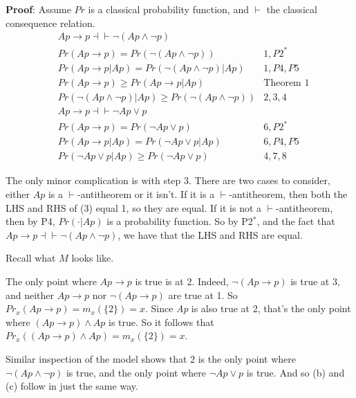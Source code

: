 \TheoremTwo

\noindent \textbf{Proof}: Assume $Pr$ is a classical probability function, and $\vdash$ the classical consequence relation. 
\setcounter{equation}{0}
\begin{align}
&Ap \rightarrow p \dashv  \vdash \neg(Ap \wedge \neg p) &  \\
&Pr(Ap \rightarrow p) = Pr(\neg(Ap \wedge \neg p)) & 1, P2^* \\
&Pr(Ap \rightarrow p | Ap) = Pr(\neg(Ap \wedge \neg p) | Ap) & 1, P4, P5 \\
&Pr(Ap \rightarrow p ) \geq Pr (Ap \rightarrow p|Ap) & \text{Theorem 1} \\
&Pr(\neg(Ap \wedge \neg p) | Ap) \geq Pr(\neg(Ap \wedge \neg p)) & 2, 3, 4 \\
&Ap \rightarrow p \dashv  \vdash \neg Ap \vee p &  \\
&Pr(Ap \rightarrow p) = Pr(\neg Ap \vee p) & 6, P2^* \\
&Pr(Ap \rightarrow p | Ap) = Pr(\neg Ap \vee p | Ap) & 6, P4, P5 \\
&Pr(\neg Ap \vee p | Ap) \geq Pr(\neg Ap \vee p) & 4, 7, 8
\end{align}

\noindent The only minor complication is with step 3. There are two cases to consider, either $Ap$ is a $\vdash$-antitheorem or it isn't. If it is a $\vdash$-antitheorem, then both the LHS and RHS of (3) equal 1, so they are equal. If it is not a $\vdash$-antitheorem, then by P4, $Pr(\cdot | Ap)$ is a probability function. So by P2$^*$, and the fact that $Ap \rightarrow p \dashv  \vdash \neg(Ap \wedge \neg p)$, we have that the LHS and RHS are equal.


\TheoremThree

\noindent Recall what $M$ looks like.

\ModelPicture

\noindent The only point where $Ap \rightarrow p$ is true is at 2. Indeed, $\neg(Ap \rightarrow p)$ is true at 3, and neither $Ap \rightarrow p$ nor  $\neg(Ap \rightarrow p)$ are true at 1. So $Pr_x(Ap \rightarrow p) = m_x(\{2\}) = x$. Since \emph{Ap} is also true at 2, that's the only point where $(Ap \rightarrow p) \wedge Ap$ is true. So it follows that $Pr_x((Ap \rightarrow p) \wedge Ap) = m_x(\{2\}) = x$.

Similar inspection of the model shows that 2 is the only point where $\neg(Ap \wedge \neg p)$ is true, and the only point where $\neg Ap \vee p$ is true. And so (b) and (c) follow in just the same way.

